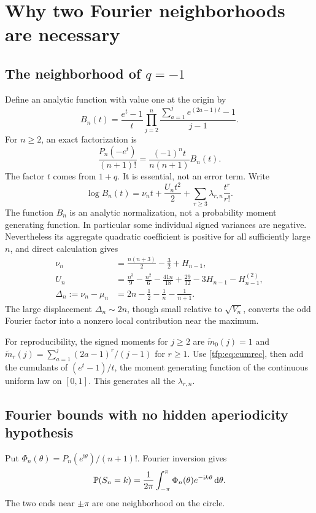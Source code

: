\documentclass[11pt,a4paper]{article}
\numberwithin{equation}{section}
\theoremstyle{definition}\newtheorem{definition}[theorem]{Definition}
\theoremstyle{remark}\newtheorem{remark}[theorem]{Remark}
\newcommand{\ii}{\mathrm i}
\newcommand{\dd}{\mathrm d}
\newcommand{\HH}[2]{H_{#1}^{(#2)}}
\begin{document}
\section{Why two Fourier neighborhoods are necessary}\label{tfp:sec:second}
\subsection{The neighborhood of \texorpdfstring{$q=-1$}{q = -1}}
Define an analytic function with value one at the origin by
\begin{equation}\label{tfp:eq:Bdef}
 B_n(t)=\frac{e^t-1}{t}
       \prod_{j=2}^n\frac{\sum_{a=1}^j e^{(2a-1)t}-1}{j-1}.
\end{equation}
For $n\ge2$, an exact factorization is
\begin{equation}\label{tfp:eq:minusfactor}
 \frac{P_n(-e^t)}{(n+1)!}
       =\frac{(-1)^n t}{n(n+1)}B_n(t).
\end{equation}
The factor $t$ comes from $1+q$. It is essential, not an error term.
Write
\begin{equation}\label{tfp:eq:lambda}
 \log B_n(t)=\nu_n t+\frac{U_nt^2}{2}
                  +\sum_{r\ge3}\lambda_{r,n}\frac{t^r}{r!}.
\end{equation}
The function $B_n$ is an analytic normalization, not a probability moment
generating function. In particular some individual signed variances are
negative. Nevertheless its aggregate quadratic coefficient is positive
for all sufficiently large $n$, and direct calculation gives
\begin{align}
 \nu_n&=\frac{n(n+3)}2-\frac32+H_{n-1},\label{tfp:eq:nu}\\
 U_n&=\frac{n^3}{9}-\frac{n^2}{6}-\frac{41n}{18}
               +\frac{29}{12}-3H_{n-1}-\HH{n-1}{2},\label{tfp:eq:U}\\
 \Delta_n:=\nu_n-\mu_n
       &=2n-\frac12-\frac1n-\frac1{n+1}.\label{tfp:eq:delta}
\end{align}
The large displacement $\Delta_n\sim2n$, though small relative to
$\sqrt{V_n}$, converts the odd Fourier factor into a nonzero local
contribution near the maximum.

For reproducibility, the signed moments for $j\ge2$ are
$\widetilde m_0(j)=1$ and
$\widetilde m_r(j)=\sum_{a=1}^j(2a-1)^r/(j-1)$ for $r\ge1$.
Use \eqref{tfp:eq:cumrec}, then add the cumulants of
$(e^t-1)/t$, the moment generating function of the continuous uniform
law on $[0,1]$. This generates all the $\lambda_{r,n}$.

\subsection{Fourier bounds with no hidden aperiodicity hypothesis}
Put $\Phi_n(\theta)=P_n(e^{\ii\theta})/(n+1)!$.
Fourier inversion gives
\begin{equation}\label{tfp:eq:fourier}
 \PP(S_n=k)=\frac1{2\pi}\int_{-\pi}^{\pi}
                    \Phi_n(\theta)e^{-\ii k\theta}\,\dd\theta.
\end{equation}
The two ends near $\pm\pi$ are one neighborhood on the circle.
\end{document}
